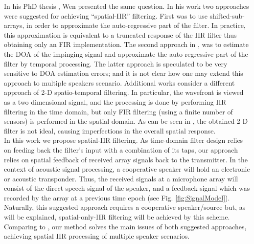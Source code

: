
In his PhD thesis \cite{wen2013array}, Wen presented the same question. In his work two approaches were suggested for achieving ``spatial-IIR'' filtering.
First was to use shifted-sub-arrays, in order to approximate the auto-regressive part of the filter.
In practice, this approximation is equivalent to a truncated response of the IIR filter thus obtaining only an FIR implementation.
The second approach in \cite{wen2013array}, was to estimate the DOA of the impinging signal and approximate the auto-regressive part of the filter by temporal processing.
The latter approach is speculated to be very sensitive to DOA estimation errors; and it is not clear how one may extend this approach to multiple speakers scenario.
Additional works \cite{Madanayake2008ABeamformer,Madanayake2009SystolicWDFs,Madanayake2008AFilters,Bruton2003Three-dimensionalBanks,Ward1986ABeamforming,Joshi2012SynthesisApplications} consider a different approach of 2-D spatio-temporal filtering. In particular, the wavefront is viewed as a two dimensional signal, and the processing is done by performing IIR filtering in the time domain, but only FIR filtering (using a finite number of sensors) is performed in the spatial domain.
As can be seen in \cite{Bruton2003Three-dimensionalBanks}, the obtained 2-D filter is not ideal, causing imperfections in the overall spatial response.
\\
In this work we propose spatial-IIR filtering. As time-domain filter design relies on feeding back the filter's input with a combination of its taps, our approach relies on spatial feedback of received array signals back to the transmitter.
In the context of acoustic signal processing, a cooperative speaker will hold an electronic or acoustic transponder. 
Thus, the received signals at a microphone array will consist of the direct speech signal of the speaker, and a feedback signal which was recorded by the array at a previous time epoch (see Fig. \ref{fig:SignalModel}). 
Naturally, this suggested approach requires a cooperative speaker/source but, as will be explained, spatial-only-IIR filtering will be achieved by this scheme.
Comparing to \cite{wen2013array}, our method solves the main issues of both suggested approaches, achieving spatial IIR processing of multiple speaker scenarios.